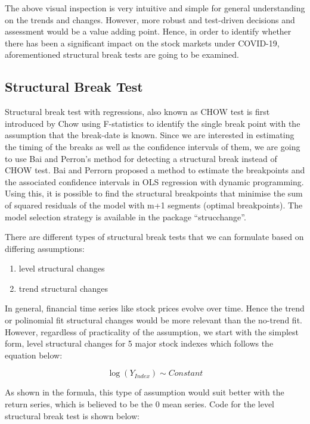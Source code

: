 \documentclass[
  11pt,
]{article}
\providecommand{\tightlist}{%
  \setlength{\itemsep}{0pt}\setlength{\parskip}{0pt}}
\begin{document}
The above visual inspection is very intuitive and simple for general
understanding on the trends and changes. However, more robust and
test-driven decisions and assessment would be a value adding point.
Hence, in order to identify whether there has been a significant impact
on the stock markets under COVID-19, aforementioned structural break
tests are going to be examined.

\hypertarget{structural-break-test}{%
\subsection{Structural Break Test}\label{structural-break-test}}

Structural break test with regressions, also known as CHOW test is first
introduced by Chow using F-statistics to identify the single break point
with the assumption that the break-date is known. Since we are
interested in estimating the timing of the breaks as well as the
confidence intervals of them, we are going to use Bai and Perron's
method for detecting a structural break instead of CHOW test. Bai and
Perrorn proposed a method to estimate the breakpoints and the associated
confidence intervals in OLS regression with dynamic programming. Using
this, it is possible to find the structural breakpoints that minimise
the sum of squared residuals of the model with m+1 segments (optimal
breakpoints). The model selection strategy is available in the package
``strucchange''.

There are different types of structural break tests that we can
formulate based on differing assumptions:

\begin{enumerate}
\def\labelenumi{\arabic{enumi}.}
\tightlist
\item
  level structural changes
\item
  trend structural changes
\end{enumerate}

In general, financial time series like stock prices evolve over time.
Hence the trend or polinomial fit structural changes would be more
relevant than the no-trend fit. However, regardless of practicality of
the assumption, we start with the simplest form, level structural
changes for 5 major stock indexes which follows the equation below:

\[ \log(Y_{Index}) \sim Constant\]

As shown in the formula, this type of assumption would suit better with
the return series, which is believed to be the 0 mean series. Code for
the level structural break test is shown below:
\end{document}
